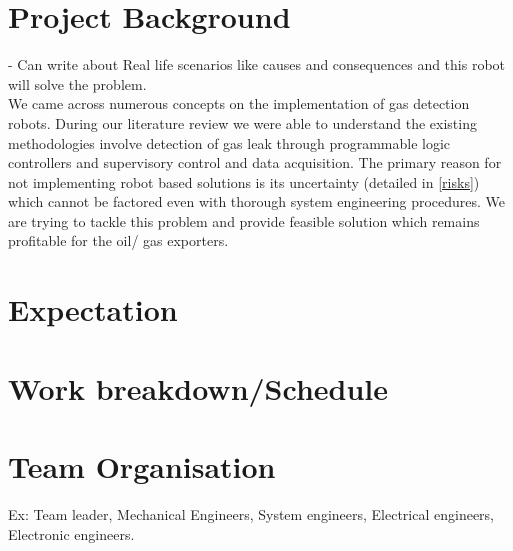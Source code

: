 \documentclass[a4paper]{article}
\begin{document}
\section {Project Background}
 - Can write about Real life scenarios like causes and consequences and this robot will solve the problem.\bigskip \\ 
 We came across numerous concepts on the implementation of gas detection robots. During our literature review we were able to understand the existing methodologies involve detection of gas leak through programmable logic controllers  and supervisory control and data acquisition. The primary reason for not implementing robot based solutions is its uncertainty (detailed in \ref{risks}) which cannot be factored even with thorough system engineering procedures. We are trying to tackle this problem and provide feasible solution which remains profitable for the oil/ gas exporters.  
\section{Expectation}

\section{Work breakdown/Schedule}

\section{Team Organisation}
Ex: Team leader, Mechanical Engineers, System engineers, Electrical engineers, Electronic engineers.
\end{document}
